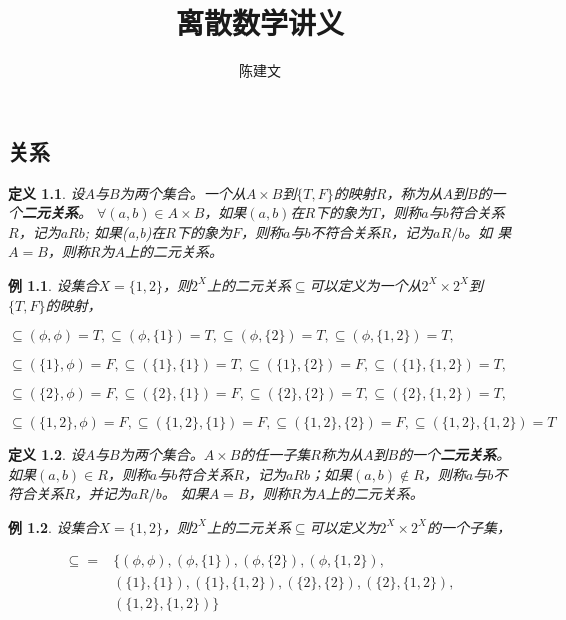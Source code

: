 \documentclass{book}[oneside]
\newtheorem{Def}{定义}[chapter]
\newtheorem{Example}{例}[chapter]
\begin{document}
\begin{CJK*}{UTF8}{gbsn}
  \title{离散数学讲义}
  \author{陈建文}
  \maketitle
  
  \setcounter{chapter}{2}
  \chapter{关系}
\begin{Def}
    设$A$与$B$为两个集合。一个从$A\times B$到$\{T,F\}$的映射$R$，称为从$A$到$B$的一个{\bfseries 二元关系}。
    $\forall (a,b) \in A \times B$，如果$(a,b)$在$R$下的象为$T$，则称$a$与$b$符合关系$R$，记为$aRb$;
    如果(a,b)在$R$下的象为$F$，则称$a$与$b$不符合关系$R$，记为$aR\!\!\! / b$。如
    果$A=B$，则称$R$为$A$上的二元关系。
  \end{Def}
  \begin{Example}
  设集合$X=\{1,2\}$，则$2^X$上的二元关系$\subseteq$可以定义为一个从$2^X\times
  2^X$到$\{T,F\}$的映射，

  $\subseteq(\phi,\phi)=T,\subseteq(\phi,\{1\})=T,\subseteq(\phi,\{2\})=T,\subseteq(\phi,\{1,2\})=T,$

    $\subseteq(\{1\},\phi)=F,\subseteq(\{1\},\{1\})=T,\subseteq(\{1\},\{2\})=F,\subseteq(\{1\},\{1,2\})=T,$

      $\subseteq(\{2\},\phi)=F,\subseteq(\{2\},\{1\})=F,\subseteq(\{2\},\{2\})=T,\subseteq(\{2\},\{1,2\})=T,$

        $\subseteq(\{1,2\},\phi)=F,\subseteq(\{1,2\},\{1\})=F,\subseteq(\{1,2\},\{2\})=F,\subseteq(\{1,2\},\{1,2\})=T$
      \end{Example}

  \begin{Def}
    设$A$与$B$为两个集合。$A\times B$的任一子集$R$称为从$A$到$B$的一个{\bfseries 二元关系}。如果$(a,b)\in R$，则称$a$与$b$符合关系$R$，记为$aRb$；如果$(a,b) \notin R$，则称$a$与$b$不符合关系$R$，并记为$aR\!\!\! / b$。
    如果$A=B$，则称$R$为$A$上的二元关系。
  \end{Def}
    \begin{Example}
  设集合$X=\{1,2\}$，则$2^X$上的二元关系$\subseteq$可以定义为$2^X\times
  2^X$的一个子集，

  \begin{equation*}
    \begin{split}
 \subseteq =& \{
 (\phi,\phi),(\phi,\{1\}),(\phi,\{2\}),(\phi,\{1,2\}),\\
 &(\{1\},\{1\}),(\{1\},\{1,2\}),(\{2\},\{2\}),(\{2\},\{1,2\}),\\
 &(\{1,2\},\{1,2\})
\}
    \end{split}
  \end{equation*}
\end{Example}


\end{CJK*}
\end{document}
